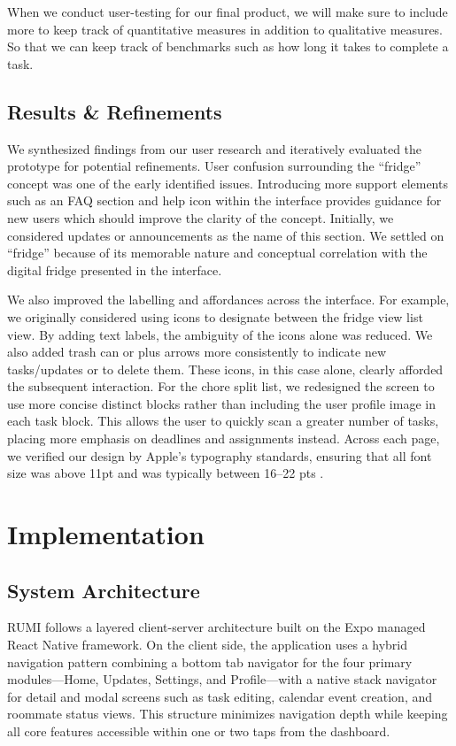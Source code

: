 \documentclass[sigconf]{acmart}
\begin{document}
When we conduct user-testing for our final product, we will make sure to include more to keep track of quantitative measures in addition to qualitative measures. So that we can keep track of benchmarks such as how long it takes to complete a task.

\subsection{Results \& Refinements}
We synthesized findings from our user research and iteratively evaluated the prototype for potential refinements. User confusion surrounding the ``fridge'' concept was one of the early identified issues. Introducing more support elements such as an FAQ section and help icon within the interface provides guidance for new users which should improve the clarity of the concept. Initially, we considered updates or announcements as the name of this section. We settled on ``fridge'' because of its memorable nature and conceptual correlation with the digital fridge presented in the interface.

We also improved the labelling and affordances across the interface. For example, we originally considered using icons to designate between the fridge view list view. By adding text labels, the ambiguity of the icons alone was reduced. We also added trash can or plus arrows more consistently to indicate new tasks/updates or to delete them. These icons, in this case alone, clearly afforded the subsequent interaction. For the chore split list, we redesigned the screen to use more concise distinct blocks rather than including the user profile image in each task block. This allows the user to quickly scan a greater number of tasks, placing more emphasis on deadlines and assignments instead. Across each page, we verified our design by Apple's typography standards, ensuring that all font size was above 11pt and was typically between 16--22 pts \cite{apple2023typography}.


\section{Implementation}

\subsection{System Architecture}
RUMI follows a layered client-server architecture built on the Expo managed React Native framework. On the client side, the application uses a hybrid navigation pattern combining a bottom tab navigator for the four primary modules---Home, Updates, Settings, and Profile---with a native stack navigator for detail and modal screens such as task editing, calendar event creation, and roommate status views. This structure minimizes navigation depth while keeping all core features accessible within one or two taps from the dashboard.
\end{document}
